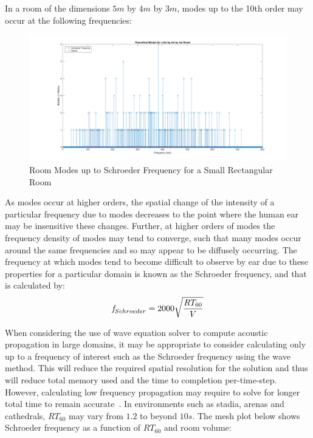 In a room of the dimensions $5m$ by $4m$ by $3m$, modes up to the 10th order may occur at the following frequencies:\\

\begin{figure}[H]
\centering
  \includegraphics[width=\textwidth]{./graphics/modesuptoschr.png}
  \caption{Room Modes up to Schroeder Frequency for a Small Rectangular Room}
\end{figure}

As modes occur at higher orders, the spatial change of the intensity of a particular frequency due to modes decreases to the point where the human ear may be insensitive these changes. Further, at higher orders of modes the frequency density of modes may tend to converge, such that many modes occur around the same frequencies and so may appear to be diffusely occurring. The frequency at which modes tend to become difficult to observe by ear due to these properties for a particular domain is known as the Schroeder frequency, and that is calculated by:\\

\begin{equation}
\textit{f}_{Schroeder} = 2000 \sqrt{\frac{RT_{60}}{V}}\\
\end{equation}

When considering the use of wave equation solver to compute acoustic propagation in large domains, it may be appropriate to consider calculating only up to a frequency of interest such as the Schroeder frequency using the wave method. This will reduce the required spatial resolution for the solution and thus will reduce total memory used and the time to completion per-time-step. However, calculating low frequency propagation may require to solve for longer total time to remain accurate~\cite{Bilbao2004a}. In environments such as stadia, arenas and cathedrals, $RT_{60}$ may vary from $1.2$ to beyond $10s$. The mesh plot below shows Schroeder frequency as a function of $RT_{60}$ and room volume: \\

